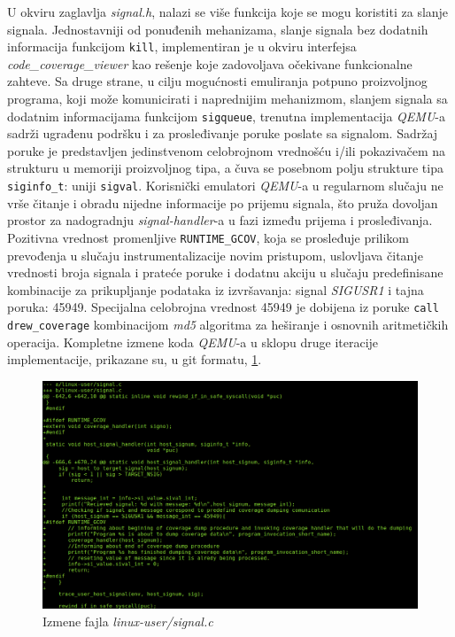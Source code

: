 \documentclass[12pt,oneside]{memoir}
\newcommand{\kod}[1]{\texttt{#1}}
\newcommand{\strano}[1]{\textit{#1}}
\begin{document}
U okviru zaglavlja \strano{signal.h}, nalazi se više funkcija koje se mogu koristiti za slanje signala. Jednostavniji od ponuđenih mehanizama, slanje signala bez dodatnih informacija funkcijom \kod{kill}, implementiran je u okviru interfejsa \strano{code\_coverage\_viewer} kao rešenje koje zadovoljava očekivane funkcionalne zahteve. Sa druge strane, u cilju mogućnosti emuliranja potpuno proizvoljnog programa, koji može komunicirati i naprednijim mehanizmom, slanjem signala sa dodatnim informacijama funkcijom \kod{sigqueue}, trenutna implementacija \strano{QEMU}-a sadrži ugrađenu podršku i za prosleđivanje poruke poslate sa signalom. Sadržaj poruke je predstavljen jedinstvenom celobrojnom vrednošću i/ili pokazivačem na strukturu u memoriji proizvoljnog tipa, a čuva se posebnom polju strukture tipa \kod{siginfo\_t}: uniji \kod{sigval}. Korisnički emulatori \strano{QEMU}-a u regularnom slučaju ne vrše čitanje i obradu nijedne informacije po prijemu signala, što pruža dovoljan prostor za nadogradnju \strano{signal-handler}-a u fazi između prijema i prosleđivanja. Pozitivna vrednost promenljive \kod{RUNTIME\_GCOV}, koja se prosleđuje prilikom prevođenja u slučaju instrumentalizacije novim pristupom, uslovljava čitanje vrednosti broja signala i prateće poruke i dodatnu akciju u slučaju predefinisane kombinacije za prikupljanje podataka iz izvršavanja: signal \strano{SIGUSR1} i tajna poruka: 45949. Specijalna celobrojna vrednost 45949 je dobijena iz poruke \kod{call drew\_coverage} kombinacijom \strano{md5} algoritma za heširanje i osnovnih aritmetičkih operacija. Kompletne izmene koda \strano{QEMU}-a u sklopu druge iteracije implementacije, prikazane su, u git formatu, \ref{fig:qemu-diff-3}.

\begin{figure}[!ht]
  \centering
  \includegraphics[width=\textwidth]{img/signal.png}
  \caption{Izmene fajla \strano{linux-user/signal.c}}
  \label{fig:qemu-diff-3}
\end{figure}
\end{document}
